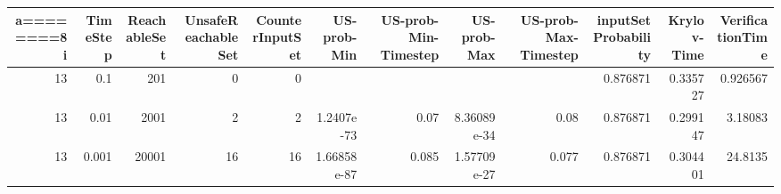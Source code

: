 \begin{tabular}{rrrrrrrrrrrr}
\hline a========8
   i &   TimeStep &   ReachableSet &   UnsafeReachableSet &   CounterInputSet &   US-prob-Min &   US-prob-Min-Timestep &   US-prob-Max &   US-prob-Max-Timestep &   inputSet Probability &   Krylov-Time &   VerificationTime \\
\hline
  13 &      0.1   &            201 &                    0 &                 0 &               &                        &               &                        &               0.876871 &      0.335727 &           0.926567 \\
  13 &      0.01  &           2001 &                    2 &                 2 &   1.2407e-73  &                  0.07  &   8.36089e-34 &                  0.08  &               0.876871 &      0.299147 &           3.18083  \\
  13 &      0.001 &          20001 &                   16 &                16 &   1.66858e-87 &                  0.085 &   1.57709e-27 &                  0.077 &               0.876871 &      0.304401 &          24.8135   \\
\hline
\end{tabular}




